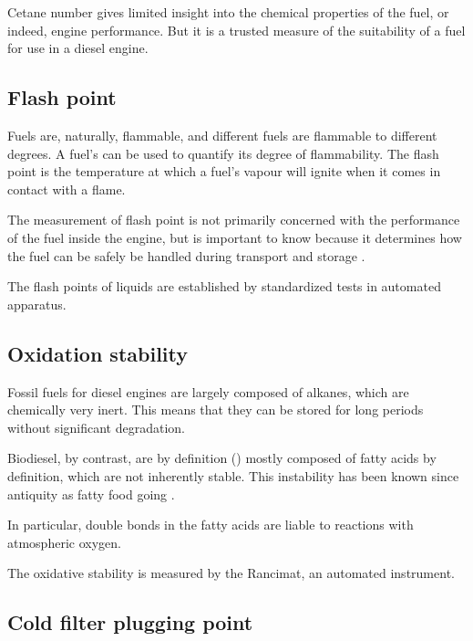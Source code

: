 Cetane number gives limited insight into the chemical properties of the fuel, or
indeed, engine performance. But it is a trusted measure of the suitability of a
fuel for use in a diesel engine. 

\subsection{Flash point}

Fuels are, naturally, flammable, and different fuels are flammable to different
degrees. A fuel's  can be used to quantify its degree of
flammability. The flash point is the temperature at which a fuel's vapour will
ignite when it comes in contact with a flame. 

The measurement of flash point is not primarily concerned with the performance
of the fuel inside the engine, but is important to know because it determines
how the fuel can be safely be handled during transport and storage
\autocite{WFCC2009}.

The flash points of liquids are established by standardized tests in automated
apparatus.

\subsection{Oxidation stability}

Fossil fuels for diesel engines are largely composed of alkanes, which are
chemically very inert. This means that they can be stored for long periods
without significant degradation.

Biodiesel, by contrast, are by definition (\autocite[Paragraph 4.1.1]{SANS1935})
mostly composed of fatty acids by definition, which are not inherently stable.
This instability has been known since antiquity as fatty food going
. 


In particular, double bonds in the fatty acids are liable to reactions with
atmospheric oxygen. 


The oxidative stability is measured by the Rancimat, an automated instrument. 

\subsection{Cold filter plugging point}


